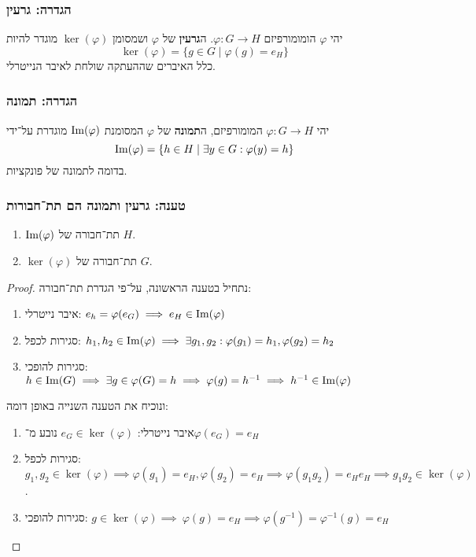 \subsubsection{הגדרה: גרעין}
יהי $\varphi$ הומומורפיזם $\varphi : G \to H$.
ה\textbf{גרעין} של $\varphi$ ושמסומן $\ker(\varphi)$ מוגדר להיות
\[
	\ker(\varphi) = \{ g \in G \mid \varphi(g) = e_H \}
\]
כלל האיברים שההעתקה שולחת לאיבר הנייטרלי.

\subsubsection{הגדרה: תמונה}
יהי $\varphi : G \to H$ המומורפיזם, ה\textbf{תמונה} של $\varphi$ המסומנת $\operatorname{Im}(\varphi)$ מוגדרת על־ידי
\[
	\operatorname{Im}(\varphi) = \{ h \in H \mid \exists y \in G : \varphi(y) = h \}
\]
בדומה לתמונה של פונקציות.

\subsubsection{טענה: גרעין ותמונה הם תת־חבורות}
\begin{enumerate}
	\item $\operatorname{Im}(\varphi)$ תת־חבורה של $H$.
	\item $\ker(\varphi)$ תת־חבורה של $G$.
\end{enumerate}
\begin{proof}
	נתחיל בטענה הראשונה, על־פי הגדרת תת־חבורה:
	\begin{enumerate}
		\item איבר נייטרלי: $e_h = \varphi(e_G) \implies e_H \in \operatorname{Im}(\varphi)$
		\item סגירות לכפל: $h_1, h_2 \in \operatorname{Im}(\varphi) \implies \exists g_1, g_2 : \varphi(g_1) = h_1, \varphi(g_2) = h_2$
		\item סגירות להופכי: $h \in \operatorname{Im}(G) \implies \exists g \in \varphi(G) = h \implies \varphi(g) = h^{-1} \implies h^{-1} \in \operatorname{Im}(\varphi)$
	\end{enumerate}
	ונוכיח את הטענה השנייה באופן דומה:
	\begin{enumerate}
		\item איבר נייטרלי: $e_G \in \ker(\varphi)$ נובע מ־$\varphi(e_G) = e_H$
		\item סגירות לכפל: $ g_1, g_2 \in \ker(\varphi) \implies \varphi(g_1) = e_H, \varphi(g_2) = e_H \implies \varphi(g_1g_2) = e_H e_H \implies g_1g_2 \in \ker(\varphi)$.
		\item סגירות להופכי: $g \in \ker(\varphi) \implies\ \varphi(g) = e_H \implies \varphi(g^{-1}) = \varphi^{-1}(g) = e_H$
	\end{enumerate}
\end{proof}

